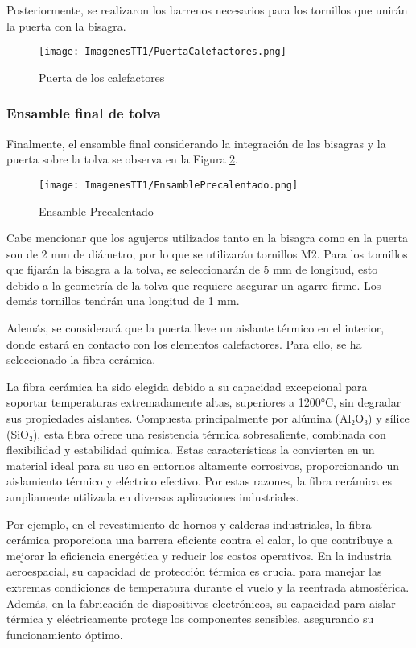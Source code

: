 \documentclass[14pt,oneside]{extarticle} %
\begin{document}
Posteriormente, se realizaron los barrenos necesarios para los tornillos que unirán la puerta con la bisagra. 

\begin{figure}[H]
    \centering
    \texttt{[image: ImagenesTT1/PuertaCalefactores.png]}
    \caption{Puerta de los calefactores}
    \label{fig:puertacalefactores}
\end{figure}

\subsubsection{Ensamble final de tolva}
Finalmente, el ensamble final considerando la integración de las bisagras y la puerta sobre la tolva se observa en la Figura \ref{fig:EnsamblePrecalentado}.

\begin{figure}[H]
    \centering
    \texttt{[image: ImagenesTT1/EnsamblePrecalentado.png]}
    \caption{Ensamble Precalentado}
    \label{fig:EnsamblePrecalentado}
\end{figure}


Cabe mencionar que los agujeros utilizados tanto en la bisagra como en la puerta son de 2 mm de diámetro, por lo que se utilizarán tornillos M2. Para los tornillos que fijarán la bisagra a la tolva, se seleccionarán de 5 mm de longitud, esto debido a la geometría de la tolva que requiere asegurar un agarre firme. Los demás tornillos tendrán una longitud de 1 mm.

Además, se considerará que la puerta lleve un aislante térmico en el interior, donde estará en contacto con los elementos calefactores. Para ello, se ha seleccionado la fibra cerámica.

La fibra cerámica ha sido elegida debido a su capacidad excepcional para soportar temperaturas extremadamente altas, superiores a 1200°C, sin degradar sus propiedades aislantes. Compuesta principalmente por alúmina (Al₂O₃) y sílice (SiO₂), esta fibra ofrece una resistencia térmica sobresaliente, combinada con flexibilidad y estabilidad química. Estas características la convierten en un material ideal para su uso en entornos altamente corrosivos, proporcionando un aislamiento térmico y eléctrico efectivo. Por estas razones, la fibra cerámica es ampliamente utilizada en diversas aplicaciones industriales.

Por ejemplo, en el revestimiento de hornos y calderas industriales, la fibra cerámica proporciona una barrera eficiente contra el calor, lo que contribuye a mejorar la eficiencia energética y reducir los costos operativos. En la industria aeroespacial, su capacidad de protección térmica es crucial para manejar las extremas condiciones de temperatura durante el vuelo y la reentrada atmosférica. Además, en la fabricación de dispositivos electrónicos, su capacidad para aislar térmica y eléctricamente protege los componentes sensibles, asegurando su funcionamiento óptimo.
\end{document}
